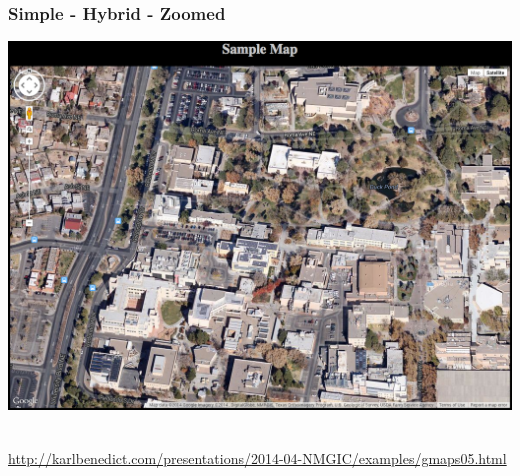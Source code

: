 \documentclass[]{article}
\begin{document}
\subsubsection{Simple - Hybrid - Zoomed}\label{simple---hybrid---zoomed}

\includegraphics{images/google_05.jpg}~

\url{http://karlbenedict.com/presentations/2014-04-NMGIC/examples/gmaps05.html}
\end{document}
